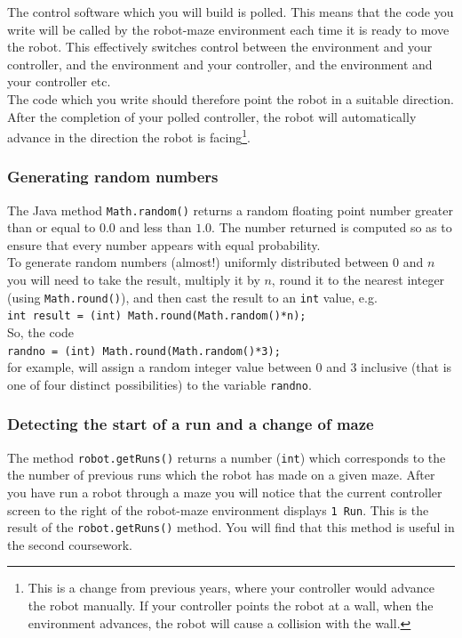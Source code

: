 The control software which you will build is polled. This means that the 
code you write will be called by the robot-maze environment each time it is
ready to move the robot. This effectively switches control between 
the environment and your controller, and the environment and your 
controller, and the environment and your controller etc. \\

\noindent
The code which you write should therefore point the robot in a suitable 
direction. After the completion of your polled controller, the robot will automatically
advance in the direction the robot is facing\footnote{This is a change from previous years,
where your controller would advance the robot manually. If your controller points the robot at a wall,
when the environment advances, the robot will cause a collision with the wall.}.

\subsubsection{Generating random numbers}

The Java method {\tt Math.random()} returns a random floating point number 
greater than or equal to $0.0$ and less than $1.0$. The number
returned is computed so as to ensure that every number appears with
equal probability. \\

\noindent
To generate random numbers (almost!) uniformly distributed
between $0$ and $n$ you will need to take the result, multiply it by $n$, 
round it to the nearest integer (using {\tt Math.round()}), and then  
cast the result to an {\tt int} value, e.g. \\

{\tt int result = (int) Math.round(Math.random()*n);} \\

\noindent
So, the code \\

{\tt randno = (int) Math.round(Math.random()*3);} \\

\noindent
for example, will assign a random integer value between 0 and 3 inclusive 
(that is one of four distinct possibilities) to the variable {\tt randno}.

\subsubsection{Detecting the start of a run and a change of maze}


The method {\tt robot.getRuns()} returns a number ({\tt int}) which 
corresponds to the the number of previous runs which the robot has made 
on a given maze.  
After you have run a robot through a maze you will notice that the current
controller screen to the right of the robot-maze environment displays 
{\tt 1 Run}. This is the result of the {\tt robot.getRuns()} method. 
You will find that this method is useful in the second coursework.




